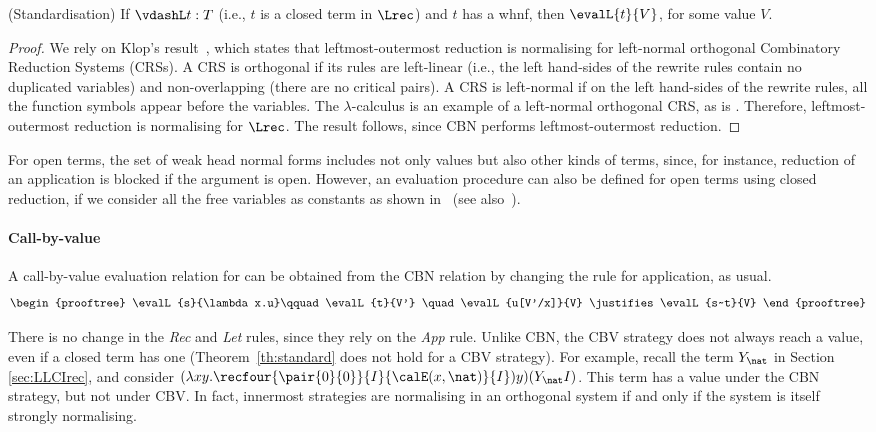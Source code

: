 \documentclass{article}
\begin{document}
\begin{theorem}(Standardisation)
\label{th:standard} 
If $\vdashL t:T$ (i.e., $t$ is a closed term in
  $\Lrec$) and $t$ has a whnf, then $\evalL{t}{V}$, for some
  value $V$.
\end{theorem}
\begin{proof}
We rely on Klop's result~\cite{Klop-thesis,terese2005}, which states
that leftmost-outermost reduction 
is normalising for left-normal orthogonal Combinatory
Reduction Systems (CRSs). A CRS is orthogonal if its rules are
left-linear (i.e., the left hand-sides of the rewrite rules contain no
duplicated variables) and non-overlapping (there are no critical
pairs). A CRS is left-normal if on the left hand-sides of the rewrite
rules, all the function symbols appear before the variables.  The
$\lambda$-calculus is an example of a  left-normal orthogonal CRS, as
is  \LLCIrec. Therefore, leftmost-outermost reduction is normalising for $\Lrec$.
The result follows, since CBN performs leftmost-outermost reduction.
\end{proof}

For open terms, the set of weak head normal forms includes not only
values but also other kinds of terms, since, for instance, reduction
of an application is blocked if the argument is open.  However, an evaluation procedure can also be defined for open terms using closed reduction, if we
consider all the free variables as constants as shown
in~\cite{fernandezM:clores} (see also~\cite{BergerU91}).

\paragraph{Call-by-value}
A call-by-value evaluation relation for \LLCIrec can be obtained
from the CBN relation by changing the rule for application, as usual.
\[
\begin{prooftree}
\evalL{s}{\lambda x.u}\qquad \evalL{t}{V'} \quad \evalL{u[V'/x]}{V}
\justifies
\evalL{s~t}{V}
\end{prooftree}
\]




There is no change in the  \emph{Rec} and \emph{Let} rules, since they
rely on the \emph{App} rule.  Unlike CBN, the CBV strategy does not always 
reach a value, even if a closed term has one (Theorem~\ref{th:standard} does not hold for a CBV strategy).
For example, recall the term $Y_\nat$ in Section \ref{sec:LLCIrec},
and consider $(\lambda
xy.\recfour{\pair{0}{0}}{I}{\calE(x,\nat)}{I})y)(Y_{\nat}I)$. This
term has a value under the CBN strategy, but not under CBV.
In fact, innermost strategies are normalising in an orthogonal system
if and only if the system is itself strongly normalising.
\end{document}
